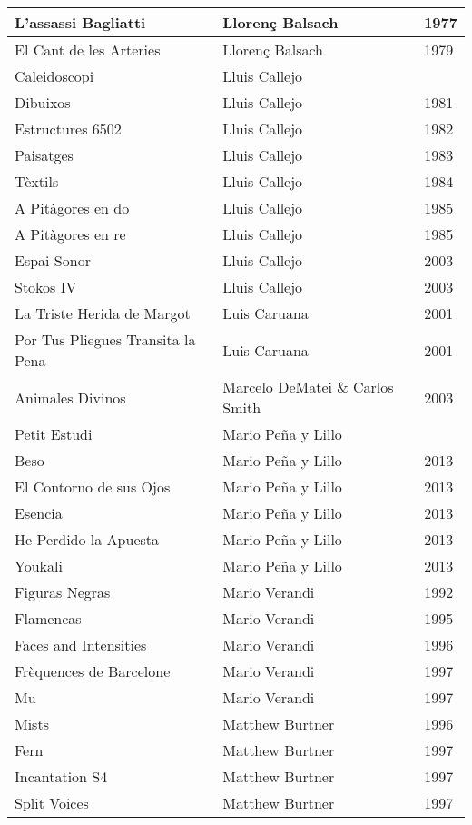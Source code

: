 \begin{center}
\begin{longtable}{| p{} | p{} | p{} |}
L'assassi Bagliatti & Llorenç Balsach & 1977 \\ \hline 
El Cant de les Arteries & Llorenç Balsach & 1979 \\ \hline 
Caleidoscopi & Lluis Callejo &  \\ \hline 
Dibuixos & Lluis Callejo & 1981 \\ \hline 
Estructures 6502 & Lluis Callejo & 1982 \\ \hline 
Paisatges & Lluis Callejo & 1983 \\ \hline 
Tèxtils & Lluis Callejo & 1984 \\ \hline 
A Pitàgores en do & Lluis Callejo & 1985 \\ \hline 
A Pitàgores en re & Lluis Callejo & 1985 \\ \hline 
Espai Sonor & Lluis Callejo & 2003 \\ \hline 
Stokos IV & Lluis Callejo & 2003 \\ \hline 
La Triste Herida de Margot & Luis Caruana & 2001 \\ \hline 
Por Tus Pliegues Transita la Pena & Luis Caruana & 2001 \\ \hline 
Animales Divinos & Marcelo DeMatei \& Carlos Smith & 2003 \\ \hline 
Petit Estudi & Mario Peña y Lillo &  \\ \hline 
Beso & Mario Peña y Lillo & 2013 \\ \hline 
El Contorno de sus Ojos & Mario Peña y Lillo & 2013 \\ \hline 
Esencia & Mario Peña y Lillo & 2013 \\ \hline 
He Perdido la Apuesta & Mario Peña y Lillo & 2013 \\ \hline 
Youkali & Mario Peña y Lillo & 2013 \\ \hline 
Figuras Negras & Mario Verandi & 1992 \\ \hline 
Flamencas & Mario Verandi & 1995 \\ \hline 
Faces and Intensities & Mario Verandi & 1996 \\ \hline 
Frèquences de Barcelone & Mario Verandi & 1997 \\ \hline 
Mu & Mario Verandi & 1997 \\ \hline 
Mists & Matthew Burtner & 1996 \\ \hline 
Fern & Matthew Burtner & 1997 \\ \hline 
Incantation S4 & Matthew Burtner & 1997 \\ \hline 
Split Voices & Matthew Burtner & 1997 \\ \hline 

\end{longtable}
\end{center}
